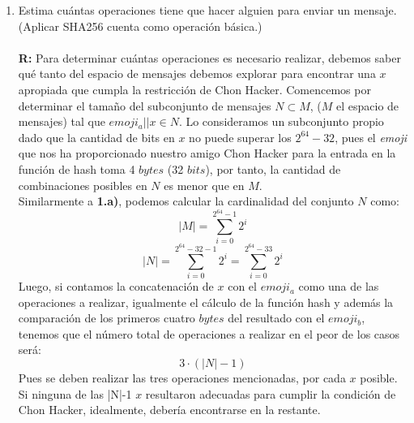 \documentclass[14pt]{article}
\begin{document}
\begin{enumerate}[label=\alph*)]
  
\item Estima cuántas operaciones tiene que hacer alguien para enviar un mensaje. (Aplicar SHA256 cuenta como operación básica.) \\ \\
  \textbf{R:}
  Para determinar cuántas operaciones es necesario realizar, debemos saber qué tanto del espacio de mensajes debemos explorar para encontrar una $x$ apropiada que cumpla la restricción de Chon Hacker.
  Comencemos por determinar el
  tamaño del subconjunto de mensajes $N \subset M$, ($M$ el espacio de mensajes) tal que $emoji_a || x \in N$. Lo consideramos un subconjunto
  propio dado que la cantidad de bits en $x$ no puede superar los $2^{64} - 32$, pues el \textit{emoji}
  que nos ha proporcionado nuestro amigo Chon Hacker para la entrada en la función de hash toma 4 $bytes$ (32 $bits$), por tanto, la cantidad de combinaciones posibles en $N$ es menor que en $M$.\\
  
  Similarmente a \textbf{1.a)}, podemos calcular la cardinalidad del conjunto $N$ como:
  \begin{equation}
    |M| = \sum_{i = 0}^{2^{64} - 1} 2^i
  \end{equation}
  \begin{equation}
    |N| = \sum_{i = 0}^{2^{64}-32-1}2^i = \sum_{i = 0}^{2^{64}-33}2^i
  \end{equation}
  Luego, si contamos la concatenación de $x$ con el $emoji_a$ como una de las operaciones a realizar, igualmente el cálculo de la función hash y además la comparación de los primeros cuatro $bytes$
  del resultado con el $emoji_b$, tenemos que el número total de operaciones a realizar en el
  peor de los casos será:
  \begin{equation}
    3 \cdot (|N| - 1)
  \end{equation}
  Pues se deben realizar las tres operaciones mencionadas, por cada $x$ posible. Si ninguna de
  las |N|-1 $x$ resultaron adecuadas para cumplir la condición de Chon Hacker, idealmente, debería
  encontrarse en la restante.\\
  

\end{enumerate}
\end{document}
